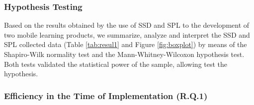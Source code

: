 \subsubsection{Hypothesis Testing}

Based on the results obtained by the use of SSD and SPL to the development of two mobile learning products, we summarize, analyze and interpret the SSD and SPL collected data (Table \ref{tab:resul1} and Figure \ref{fig:boxplot}) by means of the Shapiro-Wilk normality test and the Mann-Whitney-Wilcoxon hypothesis test. Both tests validated the statistical power of the sample, allowing test the hypothesis.

\subsubsection{Efficiency in the Time of Implementation (R.Q.1)}

